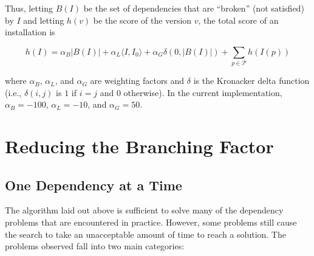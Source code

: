 \documentclass[letterpaper]{article}
\theoremstyle{definition}
\theoremstyle{remark}
\renewcommand{\P}{\mathcal{P}}
\newcommand{\idist}[2]{\langle#1,#2\rangle}
\begin{document}
Thus, letting $B(I)$ be the set of dependencies that are ``broken''
(not satisfied) by $I$ and letting $h(v)$ be the score of the version
$v$, the total score of an installation is

\begin{equation}
  h(I) = \alpha_B|B(I)| + \alpha_L \idist{I}{I_0} + \alpha_G \delta(0,|B(I)|) + \sum_{p \in \P} h(I(p))
\end{equation}

where $\alpha_B$, $\alpha_L$, and $\alpha_G$ are weighting factors and
$\delta$ is the Kronacker delta function (i.e., $\delta(i,j)$ is $1$
if $i=j$ and $0$ otherwise).  In the current implementation,
$\alpha_B=-100$, $\alpha_L=-10$, and $\alpha_G=50$.

\section{Reducing the Branching Factor}

\subsection{One Dependency at a Time}

The algorithm laid out above is sufficient to solve many of the
dependency problems that are encountered in practice.  However, some
problems still cause the search to take an unacceptable amount of time
to reach a solution.  The problems observed fall into two main
categories:
\end{document}
